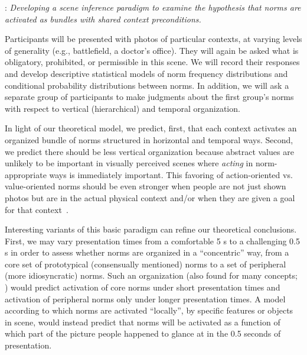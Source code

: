\documentclass[12pt]{article}
\begin{document}
\vskip 0.1in
: {\em Developing a scene inference paradigm
  to examine the hypothesis that norms are activated as bundles with
  shared context preconditions. }  \vspace{1mm}

\noindent Participants will be presented with photos of particular
contexts, at varying levels of generality (e.g., battlefield, a
doctor's office). They will again be asked what is obligatory,
prohibited, or permissible in this scene.  We will record their
responses and develop descriptive statistical models of norm frequency
distributions and conditional probability distributions between norms.
In addition, we will ask a separate group of participants to make
judgments about the first group's norms with respect to vertical
(hierarchical) and temporal organization.

In light of our theoretical model, we predict, first, that each
context activates an organized bundle of norms structured in
horizontal and temporal ways. Second, we predict there should be less
vertical organization because abstract values are unlikely to be
important in visually perceived scenes where {\em acting} in
norm-appropriate ways is immediately important.  This favoring of
action-oriented vs. value-oriented norms should be even stronger when
people are not just shown photos but are in the actual physical
context and/or when they are given a goal for that context~\citep{aarts03}.


Interesting variants of this basic paradigm can refine our theoretical
conclusions.  First, we may vary presentation times from a comfortable
5 s to a challenging 0.5 s in order to assess whether norms are
organized in a ``concentric'' way, from a core set of prototypical
(consensually mentioned) norms to a set of peripheral (more
idiosyncratic) norms.  Such an organization (also found for many
concepts; \citep{rips73,smith78}) would predict activation of core norms under
short presentation times and activation of peripheral norms only under
longer presentation times.  A model according to which norms are
activated ``locally'', by specific features or objects in scene, would
instead predict that norms will be activated as a function of which
part of the picture people happened to glance at in the 0.5 seconds of
presentation.
\end{document}
